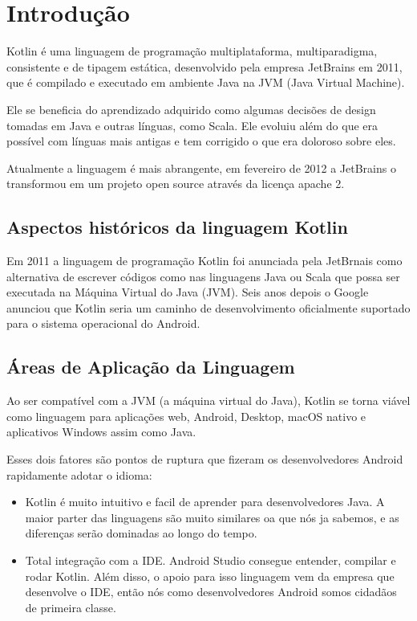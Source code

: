 

\chapter{ Introdu\c{c}\~{a}o}

Kotlin é uma linguagem de programação multiplataforma,
multiparadigma, consistente e de tipagem estática, 
desenvolvido pela empresa JetBrains em 2011, que é
compilado e executado em ambiente Java na JVM 
(Java Virtual Machine). 

Ele se beneficia do aprendizado adquirido como algumas decisões de design tomadas em Java e outras línguas,
como Scala. Ele evoluiu além do que era possível com línguas mais antigas e tem
corrigido o que era doloroso sobre eles.

Atualmente a linguagem é mais 
abrangente, em fevereiro de 2012 a JetBrains  o transformou
em um projeto open source através da licença apache 2.


\section{Aspectos hist\'{o}ricos da linguagem Kotlin}
Em 2011 a linguagem de programaç\~{a}o Kotlin foi anunciada pela JetBrnais como alternativa
de escrever códigos como nas linguagens Java ou Scala que possa ser executada na Máquina Virtual do Java
(JVM). Seis anos depois o Google anunciou que Kotlin seria um caminho de 
desenvolvimento oficialmente suportado para o sistema operacional do Android.\cite{ebel2019mastering} 

\section{\'{A}reas de Aplica\c{c}\~{a}o da Linguagem}
Ao ser compatível com a JVM (a máquina virtual do Java), 
Kotlin se torna viável como linguagem para aplicações web, 
Android, Desktop, macOS nativo e aplicativos Windows assim como Java.

Esses dois fatores são pontos de ruptura que fizeram os
desenvolvedores Android rapidamente adotar o idioma:
\begin{itemize}
	\item Kotlin é muito intuitivo e facil de aprender para desenvolvedores Java.
	A maior parter das linguagens são muito similares oa que nós ja sabemos, e as diferenças
   serão dominadas ao longo do tempo.
	
	\item Total integração com a IDE. Android Studio consegue entender,
    compilar e rodar Kotlin. Além disso, o apoio para isso
    linguagem vem da empresa que desenvolve o IDE, então nós como desenvolvedores Android
     somos cidadãos de primeira classe. 
	
\end{itemize}

